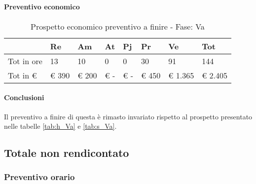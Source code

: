 			\paragraph{Preventivo economico}
				\begin{table}[H] \begin{center} \begin{tabular}{llllllll}
										\toprule
											&	\textbf{Re}	&	\textbf{Am}	&	\textbf{At}	&	\textbf{Pj}	&	\textbf{Pr}	&	\textbf{Ve}	&	\textbf{Tot}	 \\

										\midrule
										Tot in ore	&	13	&	10	&	0	&	0	&	30	&	91	&	144	 \\


										Tot in €	&	 €     390 	 & 	 €      200 	 & 	 €         -   	 & 	 €         -   	 & 	 €    450 	 & 	 €  1.365 	 & 	 €     2.405 	 \\
										\bottomrule
										\end{tabular} \end{center} \caption{Prospetto economico preventivo a finire - Fase:
										Va
										}\end{table}
			\paragraph{Conclusioni} Il preventivo a finire di questa  è rimasto invariato rispetto al prospetto presentato nelle tabelle \ref{tab:h_Va} e \ref{tab:s_Va}.
	\newpage
	\subsection{Totale non rendicontato}
		\subsubsection{Preventivo orario}


